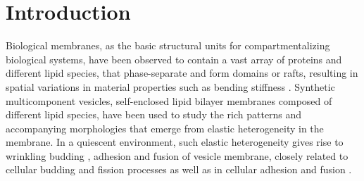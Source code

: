 \documentclass[twoside,twocolumn,9pt]{article}
\begin{document}
\renewcommand*\rmdefault{bch}\normalfont\upshape
\rmfamily
\section*{}
\vspace{-1cm}








\section{\label{sec:Introduction}Introduction}
Biological membranes, as the basic structural units for compartmentalizing biological systems, 
have been observed to contain a vast array of proteins and different
lipid species, that phase-separate and form domains or rafts, resulting
in spatial variations in material properties such as bending stiffness
\cite{}. Synthetic multicomponent vesicles, self-enclosed lipid bilayer
membranes composed of different lipid species, have been used to study
the rich patterns and accompanying morphologies that emerge from elastic heterogeneity in the membrane. In a quiescent environment,  such elastic heterogeneity gives rise to wrinkling budding \cite{Lowengrub2009_PRE,Li2012_CommMathSci}, adhesion and fusion \cite{Zhao2011_PRE} of vesicle membrane, closely related to cellular budding and fission processes \cite{Rauch2000_BiophysJ} as well as in cellular adhesion and fusion \cite{Takeda2003_PNAS}. 
\end{document}
